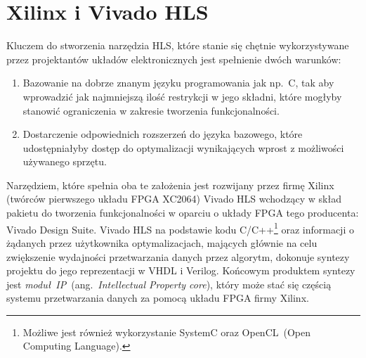 \section{Xilinx i Vivado HLS}
Kluczem do stworzenia narzędzia HLS, które stanie się chętnie wykorzystywane przez projektantów układów elektronicznych jest spełnienie dwóch warunków:
\begin{enumerate}
\item Bazowanie na dobrze znanym języku programowania jak np.~C, tak aby wprowadzić jak najmniejszą ilość restrykcji w jego składni, które mogłyby stanowić ograniczenia w zakresie tworzenia funkcjonalności.
\item Dostarczenie odpowiednich rozszerzeń do języka bazowego, które udostępniałyby dostęp do optymalizacji wynikających wprost z możliwości używanego sprzętu.
\end{enumerate}
Narzędziem, które spełnia oba te założenia jest rozwijany przez firmę Xilinx (twórców pierwszego układu FPGA XC2064) Vivado HLS wchodzący w skład pakietu do tworzenia funkcjonalności w oparciu o układy FPGA tego producenta: Vivado Design Suite. Vivado HLS na podstawie kodu C/C++\footnote{Możliwe jest również wykorzystanie SystemC oraz OpenCL~(Open Computing Language).} oraz informacji o żądanych przez użytkownika optymalizacjach, mających głównie na celu zwiększenie wydajności przetwarzania danych przez algorytm, dokonuje syntezy projektu do jego reprezentacji w VHDL i Verilog. Końcowym produktem syntezy jest \textit{moduł~IP}~(ang.~\textit{Intellectual Property core}), który może stać się częścią systemu przetwarzania danych za pomocą układu FPGA firmy Xilinx.

